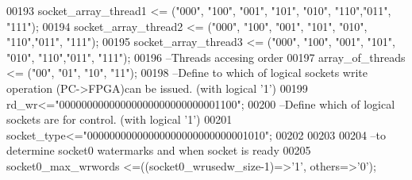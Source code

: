 \begin{DoxyCode}
00193 \textcolor{vhdlchar}{socket_array_thread1}    \textcolor{vhdlchar}{<=} \textcolor{vhdlchar}{(}\textcolor{vhdllogic}{"000"}\textcolor{vhdlchar}{,} \textcolor{vhdllogic}{"100"}\textcolor{vhdlchar}{,} \textcolor{vhdllogic}{"001"}\textcolor{vhdlchar}{,} \textcolor{vhdllogic}{"101"}\textcolor{vhdlchar}{,} \textcolor{vhdllogic}{"010"}\textcolor{vhdlchar}{,} \textcolor{vhdllogic}{"110"}\textcolor{vhdlchar}{,}\textcolor{vhdllogic}{"011"}\textcolor{vhdlchar}{,} \textcolor{vhdllogic}{"111"}\textcolor{vhdlchar}{)};
00194 \textcolor{vhdlchar}{socket_array_thread2}    \textcolor{vhdlchar}{<=} \textcolor{vhdlchar}{(}\textcolor{vhdllogic}{"000"}\textcolor{vhdlchar}{,} \textcolor{vhdllogic}{"100"}\textcolor{vhdlchar}{,} \textcolor{vhdllogic}{"001"}\textcolor{vhdlchar}{,} \textcolor{vhdllogic}{"101"}\textcolor{vhdlchar}{,} \textcolor{vhdllogic}{"010"}\textcolor{vhdlchar}{,} \textcolor{vhdllogic}{"110"}\textcolor{vhdlchar}{,}\textcolor{vhdllogic}{"011"}\textcolor{vhdlchar}{,} \textcolor{vhdllogic}{"111"}\textcolor{vhdlchar}{)};
00195 \textcolor{vhdlchar}{socket_array_thread3}    \textcolor{vhdlchar}{<=} \textcolor{vhdlchar}{(}\textcolor{vhdllogic}{"000"}\textcolor{vhdlchar}{,} \textcolor{vhdllogic}{"100"}\textcolor{vhdlchar}{,} \textcolor{vhdllogic}{"001"}\textcolor{vhdlchar}{,} \textcolor{vhdllogic}{"101"}\textcolor{vhdlchar}{,} \textcolor{vhdllogic}{"010"}\textcolor{vhdlchar}{,} \textcolor{vhdllogic}{"110"}\textcolor{vhdlchar}{,}\textcolor{vhdllogic}{"011"}\textcolor{vhdlchar}{,} \textcolor{vhdllogic}{"111"}\textcolor{vhdlchar}{)};
00196 \textcolor{keyword}{--Threads accesing order}
00197 \textcolor{vhdlchar}{array_of_threads}        \textcolor{vhdlchar}{<=} \textcolor{vhdlchar}{(}\textcolor{vhdllogic}{"00"}\textcolor{vhdlchar}{,} \textcolor{vhdllogic}{"01"}\textcolor{vhdlchar}{,} \textcolor{vhdllogic}{"10"}\textcolor{vhdlchar}{,} \textcolor{vhdllogic}{"11"}\textcolor{vhdlchar}{)};
00198 \textcolor{keyword}{--Define to which of logical sockets write operation (PC->FPGA)can be issued. (with logical '1')}
00199 \textcolor{vhdlchar}{rd_wr}\textcolor{vhdlchar}{<=}\textcolor{vhdllogic}{"00000000000000000000000000001100"};
00200 \textcolor{keyword}{--Define which of logical sockets are for control. (with logical '1')}
00201 \textcolor{vhdlchar}{socket_type}\textcolor{vhdlchar}{<=}\textcolor{vhdllogic}{"00000000000000000000000000001010"};
00202 
00203 
00204 \textcolor{keyword}{--to determine socket0 watermarks and when socket is ready}
00205 \textcolor{vhdlchar}{socket0_max_wrwords}         \textcolor{vhdlchar}{<=}\textcolor{vhdlchar}{(}\textcolor{vhdlchar}{(}\textcolor{vhdlchar}{socket0_wrusedw_size}\textcolor{vhdlchar}{-}\textcolor{vhdllogic}{}\textcolor{vhdllogic}{1}\textcolor{vhdlchar}{)}\textcolor{vhdlchar}{=}\textcolor{vhdlchar}{>}\textcolor{vhdlchar}{'}\textcolor{vhdllogic}{}\textcolor{vhdllogic}{1}\textcolor{vhdlchar}{'}\textcolor{vhdlchar}{,} \textcolor{keywordflow}{others}\textcolor{vhdlchar}{=}\textcolor{vhdlchar}{>}\textcolor{vhdlchar}{'}\textcolor{vhdllogic}{}\textcolor{vhdllogic}{0}\textcolor{vhdlchar}{'}\textcolor{vhdlchar}{)};

\end{DoxyCode}
